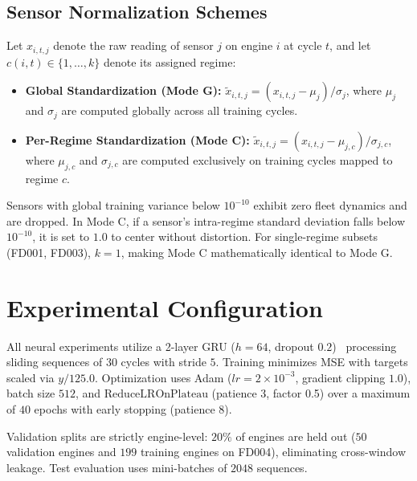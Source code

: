 \documentclass[conference]{IEEEtran}
\begin{document}
\subsection{Sensor Normalization Schemes}
Let $x_{i,t,j}$ denote the raw reading of sensor $j$ on engine $i$ at cycle $t$, and let $c(i,t) \in \{1, \dots, k\}$ denote its assigned regime:
\begin{itemize}
    \item \textbf{Global Standardization (Mode G):} $\tilde{x}_{i,t,j} = (x_{i,t,j} - \mu_j) / \sigma_j$, where $\mu_j$ and $\sigma_j$ are computed globally across all training cycles.
    \item \textbf{Per-Regime Standardization (Mode C):} $\tilde{x}_{i,t,j} = (x_{i,t,j} - \mu_{j,c}) / \sigma_{j,c}$, where $\mu_{j,c}$ and $\sigma_{j,c}$ are computed exclusively on training cycles mapped to regime $c$.
\end{itemize}
Sensors with global training variance below $10^{-10}$ exhibit zero fleet dynamics and are dropped. In Mode C, if a sensor's intra-regime standard deviation falls below $10^{-10}$, it is set to $1.0$ to center without distortion. For single-regime subsets (FD001, FD003), $k=1$, making Mode C mathematically identical to Mode G.

\section{Experimental Configuration}
All neural experiments utilize a 2-layer GRU ($h=64$, dropout $0.2$)~\cite{cho2014gru} processing sliding sequences of $30$ cycles with stride $5$. Training minimizes MSE with targets scaled via $y/125.0$. Optimization uses Adam ($lr = 2\times 10^{-3}$, gradient clipping $1.0$), batch size $512$, and $\text{ReduceLROnPlateau}$ (patience 3, factor 0.5) over a maximum of $40$ epochs with early stopping (patience 8).

Validation splits are strictly engine-level: $20\%$ of engines are held out ($50$ validation engines and $199$ training engines on FD004), eliminating cross-window leakage. Test evaluation uses mini-batches of $2048$ sequences.
\end{document}
